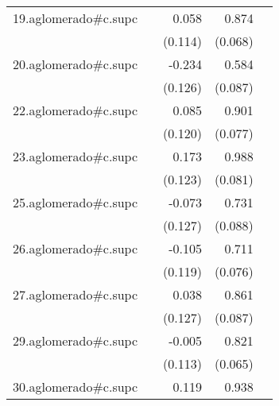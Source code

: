 {\begin{longtable}{l*{4}{D{.}{.}{-1}}}
\addlinespace
19.aglomerado#c.supc&                     &       0.058         &       0.874\sym{***}&                     \\
            &                     &     (0.114)         &     (0.068)         &                     \\
\addlinespace
20.aglomerado#c.supc&                     &      -0.234         &       0.584\sym{***}&                     \\
            &                     &     (0.126)         &     (0.087)         &                     \\
\addlinespace
22.aglomerado#c.supc&                     &       0.085         &       0.901\sym{***}&                     \\
            &                     &     (0.120)         &     (0.077)         &                     \\
\addlinespace
23.aglomerado#c.supc&                     &       0.173         &       0.988\sym{***}&                     \\
            &                     &     (0.123)         &     (0.081)         &                     \\
\addlinespace
25.aglomerado#c.supc&                     &      -0.073         &       0.731\sym{***}&                     \\
            &                     &     (0.127)         &     (0.088)         &                     \\
\addlinespace
26.aglomerado#c.supc&                     &      -0.105         &       0.711\sym{***}&                     \\
            &                     &     (0.119)         &     (0.076)         &                     \\
\addlinespace
27.aglomerado#c.supc&                     &       0.038         &       0.861\sym{***}&                     \\
            &                     &     (0.127)         &     (0.087)         &                     \\
\addlinespace
29.aglomerado#c.supc&                     &      -0.005         &       0.821\sym{***}&                     \\
            &                     &     (0.113)         &     (0.065)         &                     \\
\addlinespace
30.aglomerado#c.supc&                     &       0.119         &       0.938\sym{***}&                     \\

\end{longtable}}
